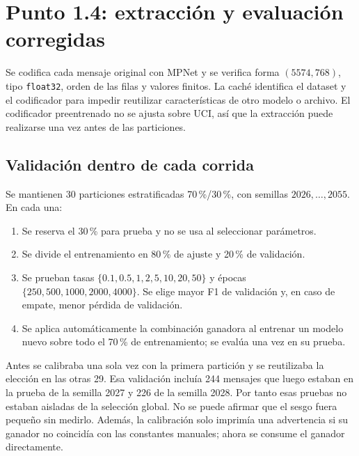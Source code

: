 \documentclass[11pt,letterpaper]{article}
\renewcommand{\_}{\originalunderscore\allowbreak}
\begin{document}
\section{Punto 1.4: extracción y evaluación corregidas}
Se codifica cada mensaje original con MPNet y se verifica forma $(5574,768)$,
tipo \texttt{float32}, orden de las filas y valores finitos. La caché identifica
el dataset y el codificador para impedir reutilizar características de otro
modelo o archivo. El codificador preentrenado no se ajusta sobre UCI, así que
la extracción puede realizarse una vez antes de las particiones.

\subsection{Validación dentro de cada corrida}
Se mantienen 30 particiones estratificadas 70\,\%/30\,\%, con semillas
$2026,\ldots,2055$. En cada una:
\begin{enumerate}
\item Se reserva el 30\,\% para prueba y no se usa al seleccionar parámetros.
\item Se divide el entrenamiento en 80\,\% de ajuste y 20\,\% de validación.
\item Se prueban tasas $\{0.1,0.5,1,2,5,10,20,50\}$ y épocas
$\{250,500,1000,2000,4000\}$. Se elige mayor F1 de validación y, en caso de
empate, menor pérdida de validación.
\item Se aplica automáticamente la combinación ganadora al entrenar un modelo
nuevo sobre todo el 70\,\% de entrenamiento; se evalúa una vez en su prueba.
\end{enumerate}

Antes se calibraba una sola vez con la primera partición y se reutilizaba
la elección en las otras 29. Esa validación incluía 244 mensajes que luego
estaban en la prueba de la semilla 2027 y 226 de la semilla 2028. Por tanto
esas pruebas no estaban aisladas de la selección global. No se puede afirmar
que el sesgo fuera pequeño sin medirlo. Además, la calibración solo imprimía
una advertencia si su ganador no coincidía con las constantes manuales; ahora
se consume el ganador directamente.

\end{document}

